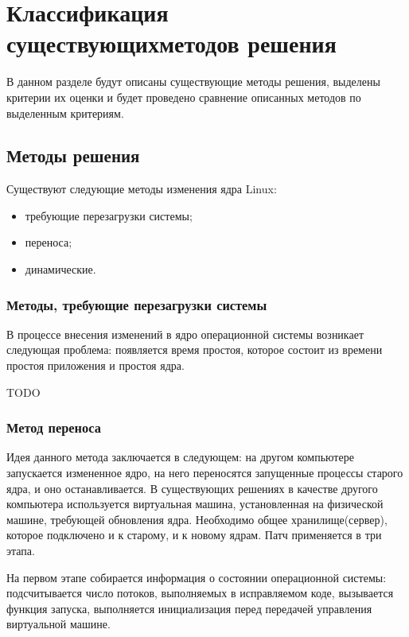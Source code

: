 \chapter{Классификация существующих\linebreak методов решения}

В данном разделе будут описаны существующие методы решения, выделены критерии их оценки и будет проведено сравнение описанных методов по выделенным критериям.

\section{Методы решения}

Существуют следующие методы изменения ядра Linux:

\begin{itemize}
	\item требующие перезагрузки системы;
	\item переноса;
	\item динамические.
\end{itemize}

\subsection{Методы, требующие перезагрузки системы}

\cite{reboot}

В процессе внесения изменений в ядро операционной системы возникает следующая проблема: появляется время простоя, которое состоит из времени простоя приложения и простоя ядра.

TODO

\subsection{Метод переноса}

Идея данного метода \cite{dynamic} заключается в следующем: на другом компьютере запускается измененное ядро, на него переносятся запущенные процессы старого ядра, и оно останавливается. В существующих решениях в качестве другого компьютера используется виртуальная машина, установленная на физической машине, требующей обновления ядра. Необходимо общее хранилище(сервер), которое подключено и к старому, и к новому ядрам. Патч применяется в три этапа.

На первом этапе собирается информация о состоянии операционной системы: подсчитывается число потоков, выполняемых в исправляемом коде, вызывается функция запуска, выполняется инициализация перед передачей управления виртуальной машине.

